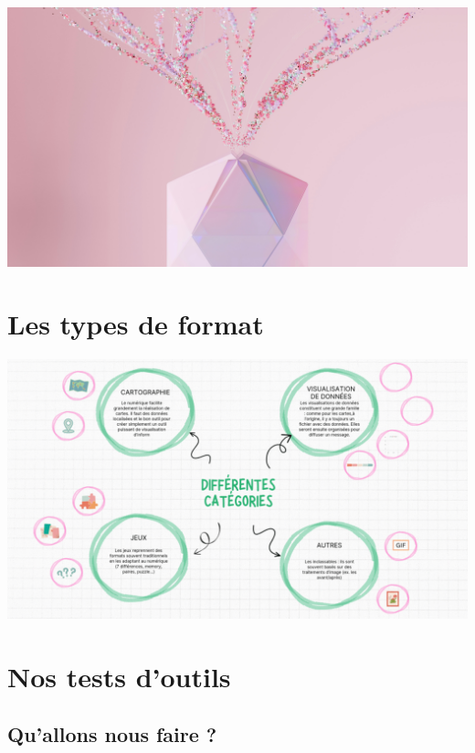 \documentclass[
  letterpaper,
  DIV=11,
  numbers=noendperiod]{scrartcl}
\begin{document}
\begin{center}
\includegraphics{img/google-deepmind-Oy2yXvl1WLg-unsplash.jpg}
\end{center}

\section{Les types de format}\label{les-types-de-format}

\begin{center}
\includegraphics{img/categ-formats.gif}
\end{center}

\section{Nos tests d'outils}\label{nos-tests-doutils}

\subsection{Qu'allons nous faire ?}\label{quallons-nous-faire}
\end{document}

